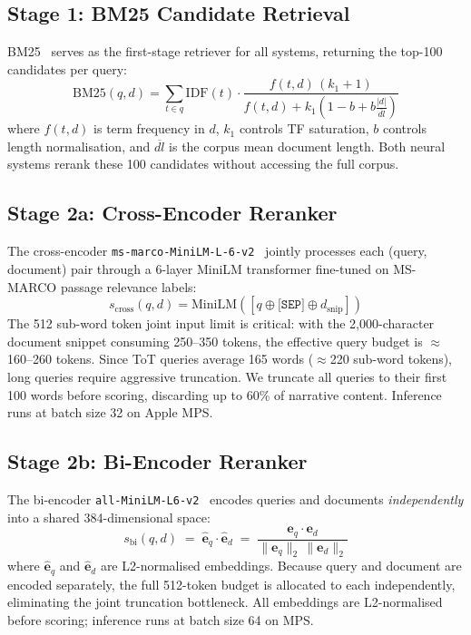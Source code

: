 \documentclass[conference]{IEEEtran}
\begin{document}
\subsection{Stage 1: BM25 Candidate Retrieval}
BM25~\cite{bm25} serves as the first-stage retriever for all systems,
returning the top-100 candidates per query:
\begin{equation}
  \text{BM25}(q,d) = \sum_{t \in q} \text{IDF}(t) \cdot
  \frac{f(t,d)\,(k_1+1)}{f(t,d) + k_1\!\left(1 - b + b\tfrac{|d|}{\overline{dl}}\right)}
\label{eq:bm25}
\end{equation}
where $f(t,d)$ is term frequency in $d$, $k_1$ controls TF saturation,
$b$ controls length normalisation, and $\overline{dl}$ is the corpus mean document length.
Both neural systems rerank these 100 candidates without accessing the full corpus.

\subsection{Stage 2a: Cross-Encoder Reranker}
The cross-encoder \texttt{ms-marco-MiniLM-L-6-v2}~\cite{wang2020} jointly processes
each (query, document) pair through a 6-layer MiniLM transformer fine-tuned on
MS-MARCO passage relevance labels:
\begin{equation}
  s_{\text{cross}}(q,d) = \text{MiniLM}([q \oplus \texttt{[SEP]} \oplus d_{\text{snip}}])
\end{equation}
The 512 sub-word token joint input limit is critical: with the 2{,}000-character
document snippet consuming 250--350 tokens, the effective query budget is
$\approx$160--260 tokens.
Since ToT queries average 165 words ($\approx$220 sub-word tokens), long queries
require aggressive truncation.
We truncate all queries to their first 100 words before scoring, discarding up to
60\% of narrative content.
Inference runs at batch size 32 on Apple MPS.

\subsection{Stage 2b: Bi-Encoder Reranker}
The bi-encoder \texttt{all-MiniLM-L6-v2}~\cite{reimers2019} encodes queries and
documents \emph{independently} into a shared 384-dimensional space:
\begin{equation}
  s_{\text{bi}}(q,d) \;=\; \hat{\mathbf{e}}_q \cdot \hat{\mathbf{e}}_d
  \;=\; \frac{\mathbf{e}_q \cdot \mathbf{e}_d}{\|\mathbf{e}_q\|_2\,\|\mathbf{e}_d\|_2}
\end{equation}
where $\hat{\mathbf{e}}_q$ and $\hat{\mathbf{e}}_d$ are L2-normalised embeddings.
Because query and document are encoded separately, the full 512-token budget is
allocated to each independently, eliminating the joint truncation bottleneck.
All embeddings are L2-normalised before scoring; inference runs at batch size 64 on MPS.
\end{document}
